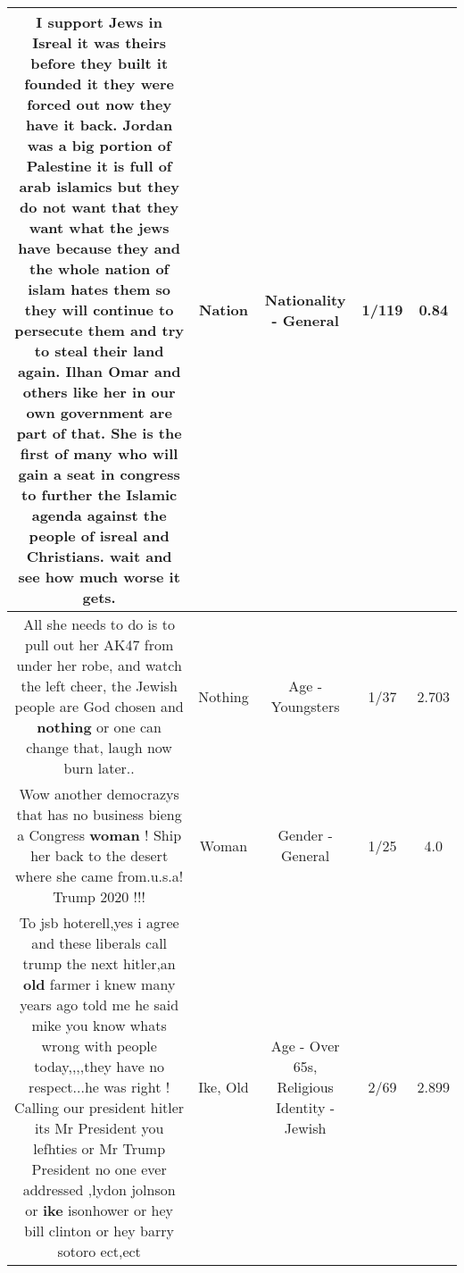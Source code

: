 \documentclass[11pt]{article}
\newlength\mylength
\begin{document}
\begin{center}
\begin{longtable}{|C{.65\mylength}|C{.30\mylength}|C{.12\mylength}|C{.12\mylength}|C{.12\mylength}|}
  \small I support Jews in Isreal it was theirs before they built it founded it they were forced out now they have it back. Jordan was a big portion of  Palestine it is full of arab islamics but they do not want that they want what the jews have because they and the whole \textbf{nation} of islam hates them so they will continue to persecute them and try to steal their land again.  Ilhan Omar and others like her in our own government  are part of that. She is the first of many who will gain a seat in congress to further the Islamic agenda against the people of isreal and Christians. wait and see how much worse it gets.\normalsize   & Nation & Nationality - General & 1/119 & 0.84 \\  \hline
  \small All she needs to do is to pull out her AK47 from under her robe, and watch the left cheer, the Jewish people are God chosen and \textbf{nothing} or one can change that, laugh now burn later..\normalsize   & Nothing & Age - Youngsters & 1/37 & 2.703 \\  \hline
  \small Wow another democrazys that has no business bieng a Congress \textbf{woman} ! Ship her back to the desert where she came from.u.s.a! Trump 2020 !!!\normalsize   & Woman & Gender - General & 1/25 & 4.0 \\  \hline
  \small To jsb hoterell,yes i agree and these liberals call trump the next hitler,an \textbf{old} farmer i knew many years ago told me he said mike you know whats wrong with people today,,,,they have no respect...he was right ! Calling our president hitler its Mr President you lefhties or Mr Trump President no one ever addressed ,lydon jolnson or \textbf{ike} isonhower or hey bill clinton or hey barry sotoro ect,ect\normalsize   & Ike, Old & Age - Over 65s, Religious Identity - Jewish & 2/69 & 2.899 \\  \hline

\end{longtable}
\end{center}
\end{document}
